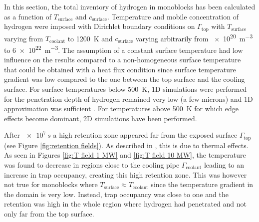 In this section, the total inventory of hydrogen in monoblocks has been calculated as a function of $T_\mathrm{surface}$ and $c_\mathrm{surface}$.
Temperature and mobile concentration of hydrogen were imposed with Dirichlet boundary conditions on $\Gamma_\mathrm{top}$ with $T_\mathrm{surface}$ varying from $T_\mathrm{coolant}$ to \SI{1200}{K} and $c_\mathrm{surface}$ varying \textcolor{black}{arbitrarily} from \SI{e20}{m^{-3}} to \SI{6e22}{m^{-3}}.
The assumption of a constant surface temperature had low influence on the results compared to a non-homogeneous surface temperature that could be obtained with a heat flux condition since surface temperature gradient was low compared to the one between the top surface and the cooling surface.
For surface temperatures below \SI{500}{K}, 1D simulations were performed for the penetration depth of hydrogen remained very low (a few microns) and 1D approximation was sufficient \cite{benannoune_numerical_2019}.
For temperatures above \SI{500}{K} for which edge effects become dominant, 2D simulations have been performed.

After $ \SI{e7}{s}$ a high retention zone appeared far from the exposed surface $\Gamma_\mathrm{top}$ (see Figure \ref{fig:retention fields}).
As described in \cite{delaporte-mathurin_finite_2019}, this is due to thermal effects.
As seen in Figures \ref{fig:T field 1 MW} and \ref{fig:T field 10 MW}, the temperature was found to decrease in regions close to the cooling pipe $\Gamma_\mathrm{coolant}$ leading to an increase in trap occupancy, creating this high retention zone.
This was however not true for monoblocks where $T_\mathrm{surface} \approx T_\mathrm{coolant}$ since the temperature gradient in the domain is very low.
Instead, trap occupancy was close to one and the retention was high in the whole region where hydrogen had penetrated and not only far from the top surface.

